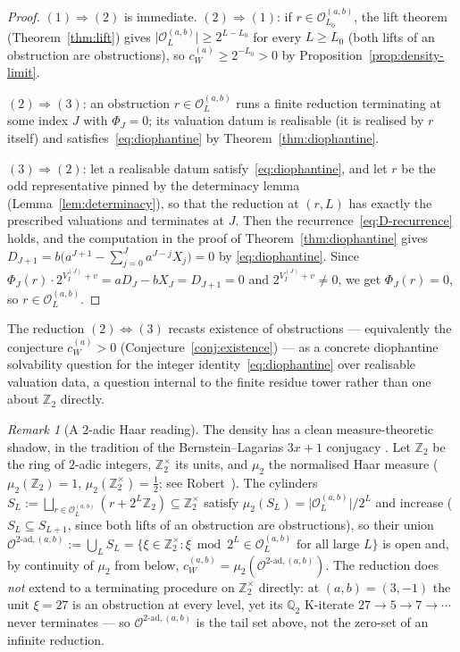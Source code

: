 \documentclass[11pt,reqno]{amsart}
\theoremstyle{plain}
\theoremstyle{definition}
\theoremstyle{remark}
\newtheorem{remark}[theorem]{Remark}
\newcommand{\Qtwo}{\mathbb{Q}_{2}}
\newcommand{\Ztwo}{\mathbb{Z}_{2}}
\newcommand{\Ztwox}{\mathbb{Z}_{2}^{\times}}
\newcommand{\Obs}{\mathcal{O}}
\newcommand{\Vi}{V_{I}}
\newcommand{\cWa}{c_{W}^{(a)}}
\newcommand{\cWab}{c_{W}^{(a,b)}}
\newcommand{\Obsab}{\Obs_{L}^{(a,b)}}
\newcommand{\Obstad}{\Obs^{\mathrm{2{\text{-}}ad},(a,b)}}
\begin{document}
\begin{proof}
$(1) \Rightarrow (2)$ is immediate. $(2) \Rightarrow (1)$: if
$r \in \Obs_{L_0}^{(a,b)}$, the lift theorem (Theorem~\ref{thm:lift})
gives $\lvert \Obsab \rvert \ge 2^{L - L_0}$ for every $L \ge L_0$ (both
lifts of an obstruction are obstructions), so $\cWa \ge 2^{-L_0} > 0$ by
Proposition~\ref{prop:density-limit}.

$(2) \Rightarrow (3)$: an obstruction $r \in \Obsab$ runs a finite
reduction terminating at some index $J$ with $\Phi_J = 0$; its valuation
datum is realisable (it is realised by $r$ itself) and
satisfies~\eqref{eq:diophantine} by Theorem~\ref{thm:diophantine}.

$(3) \Rightarrow (2)$: let a realisable datum satisfy~\eqref{eq:diophantine},
and let $r$ be the odd representative pinned by the determinacy lemma
(Lemma~\ref{lem:determinacy}), so that the reduction at $(r, L)$ has exactly
the prescribed valuations and terminates at $J$. Then the recurrence~\eqref{eq:D-recurrence} holds, and the
computation in the proof of Theorem~\ref{thm:diophantine} gives
$D_{J+1} = b\bigl(a^{J+1} - \sum_{j=0}^{J} a^{J-j} X_j\bigr) = 0$ by
\eqref{eq:diophantine}. Since
$\Phi_J(r) \cdot 2^{\Vi^{(J)} + v} = a D_J - b X_J = D_{J+1} = 0$ and
$2^{\Vi^{(J)} + v} \ne 0$, we get $\Phi_J(r) = 0$, so $r \in \Obsab$.
\qedhere
\end{proof}

The reduction $(2) \Leftrightarrow (3)$ recasts existence of obstructions
--- equivalently the conjecture $\cWa > 0$ (Conjecture~\ref{conj:existence})
--- as a concrete diophantine solvability question for the integer
identity~\eqref{eq:diophantine} over realisable valuation data, a question
internal to the finite residue tower rather than one about $\Ztwo$ directly.

\begin{remark}[A $2$-adic Haar reading]\label{rem:haar}
The density has a clean measure-theoretic shadow, in the tradition of the
Bernstein--Lagarias $3x+1$ conjugacy \cite{BernsteinLagarias1996}. Let
$\Ztwo$ be the ring of $2$-adic integers, $\Ztwox$ its units, and $\mu_2$
the normalised Haar measure ($\mu_2(\Ztwo) = 1$, $\mu_2(\Ztwox) = \tfrac12$;
see Robert~\cite{Robert2000}). The cylinders
$S_L := \bigsqcup_{r \in \Obsab}(r + 2^L \Ztwo) \subseteq \Ztwox$ satisfy
$\mu_2(S_L) = \lvert \Obsab \rvert / 2^L$ and increase
($S_L \subseteq S_{L+1}$, since both lifts of an obstruction are
obstructions), so their union
$\Obstad := \bigcup_L S_L = \{\xi \in \Ztwox : \xi \bmod 2^L \in \Obsab
\text{ for all large } L\}$ is open and, by continuity of $\mu_2$ from
below, $\cWab = \mu_2(\Obstad)$. The reduction does \emph{not} extend to a
terminating procedure on $\Ztwox$ directly: at $(a,b) = (3,-1)$ the unit
$\xi = 27$ is an obstruction at every level, yet its $\Qtwo$ K-iterate
$27 \to 5 \to 7 \to \cdots$ never terminates --- so $\Obstad$ is the tail
set above, not the zero-set of an infinite reduction.
\end{remark}
\end{document}
